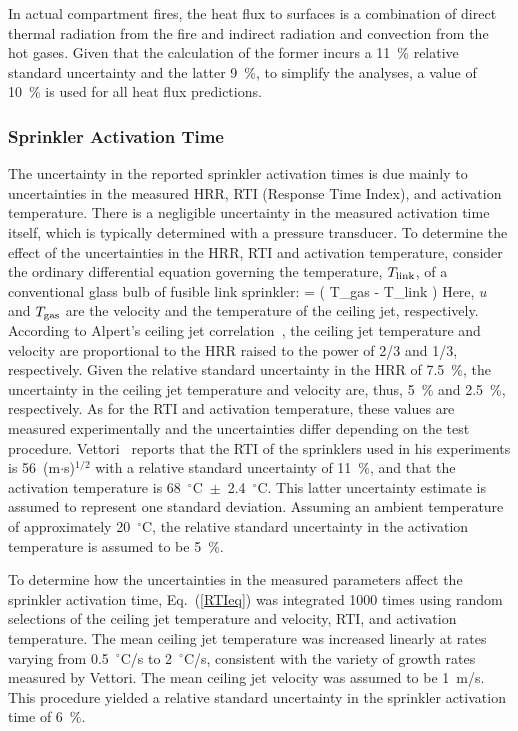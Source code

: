 In actual compartment fires, the heat flux to surfaces is a combination of direct thermal radiation from the fire and indirect radiation and convection from the hot gases. Given that the calculation of the former incurs a 11~\% relative standard uncertainty and the latter 9~\%, to simplify the analyses, a value of 10~\% is used for all heat flux predictions.

\subsubsection{Sprinkler Activation Time}

The uncertainty in the reported sprinkler activation times is due mainly to uncertainties in the measured HRR, RTI (Response Time Index), and activation temperature. There is a negligible uncertainty in the measured activation time itself, which is typically determined with a pressure transducer. To determine the effect of the uncertainties in the HRR, RTI and activation temperature, consider the ordinary differential equation governing the temperature, $T_{\rm link}$, of a conventional glass bulb of fusible link sprinkler:
\be
    =  \left( T_{\rm gas} - T_{\rm link} \right) \label{RTIeq}
\ee
Here, $u$ and $T_{\rm gas}$  are the velocity and the temperature of the ceiling jet, respectively. According to Alpert's ceiling jet correlation~\cite{SFPE:Alpert}, the ceiling jet temperature and velocity are proportional to the HRR raised to the power of 2/3 and 1/3, respectively. Given the relative standard uncertainty in the HRR of 7.5~\%, the uncertainty in the ceiling jet temperature and velocity are, thus, 5~\% and 2.5~\%, respectively. As for the RTI and activation temperature, these values are measured experimentally and the uncertainties differ depending on the test procedure. Vettori~\cite{Vettori:1} reports that the RTI of the sprinklers used in his experiments is 56~(m$\cdot$s)$^{1/2}$ with a relative standard uncertainty of 11~\%, and that the activation temperature is 68~$^\circ$C~$\pm$~2.4~$^\circ$C. This latter uncertainty estimate is assumed to represent one standard deviation. Assuming an ambient temperature of approximately 20~$^\circ$C, the relative standard uncertainty in the activation temperature is assumed to be 5~\%.

To determine how the uncertainties in the measured parameters affect the sprinkler activation time, Eq.~(\ref{RTIeq}) was integrated 1000 times using random selections of the ceiling jet temperature and velocity, RTI, and activation temperature. The mean ceiling jet temperature was increased linearly at rates varying from 0.5~$^\circ$C/s to 2~$^\circ$C/s, consistent with the variety of growth rates measured by Vettori. The mean ceiling jet velocity was assumed to be 1~m/s. This procedure yielded a relative standard uncertainty in the sprinkler activation time of 6~\%.

